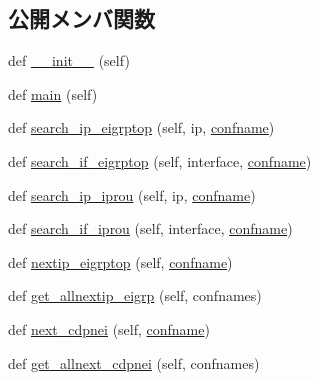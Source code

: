 \subsection*{公開メンバ関数}
\begin{DoxyCompactItemize}
\item 
def \mbox{\hyperlink{classCiscoConf_1_1CiscoRoute_a1f0e3788e7f8459ea9de2f8bd21c1b05}{\+\_\+\+\_\+init\+\_\+\+\_\+}} (self)
\item 
def \mbox{\hyperlink{classCiscoConf_1_1CiscoRoute_ae6779b3141da097bbba9ca2b15b07481}{main}} (self)
\item 
def \mbox{\hyperlink{classCiscoConf_1_1CiscoRoute_a73d916cf6fe50d2483adf1832ae99400}{search\+\_\+ip\+\_\+eigrptop}} (self, ip, \mbox{\hyperlink{classCTextFsm_1_1CTextFsm_afaf1b7c90c7fc6173ecc700966132c5c}{confname}})
\item 
def \mbox{\hyperlink{classCiscoConf_1_1CiscoRoute_ab6b6e674d00d538f497dbca5313297ce}{search\+\_\+if\+\_\+eigrptop}} (self, interface, \mbox{\hyperlink{classCTextFsm_1_1CTextFsm_afaf1b7c90c7fc6173ecc700966132c5c}{confname}})
\item 
def \mbox{\hyperlink{classCiscoConf_1_1CiscoRoute_ae513b71a4e432a9d36315e9b5705c23c}{search\+\_\+ip\+\_\+iprou}} (self, ip, \mbox{\hyperlink{classCTextFsm_1_1CTextFsm_afaf1b7c90c7fc6173ecc700966132c5c}{confname}})
\item 
def \mbox{\hyperlink{classCiscoConf_1_1CiscoRoute_abd83b9c4cb4ddaf2a35f2e750f390eb0}{search\+\_\+if\+\_\+iprou}} (self, interface, \mbox{\hyperlink{classCTextFsm_1_1CTextFsm_afaf1b7c90c7fc6173ecc700966132c5c}{confname}})
\item 
def \mbox{\hyperlink{classCiscoConf_1_1CiscoRoute_aacb6440961bd868ec0f577b9b490324f}{nextip\+\_\+eigrptop}} (self, \mbox{\hyperlink{classCTextFsm_1_1CTextFsm_afaf1b7c90c7fc6173ecc700966132c5c}{confname}})
\item 
def \mbox{\hyperlink{classCiscoConf_1_1CiscoRoute_a645db136acb549afe73227236d184edd}{get\+\_\+allnextip\+\_\+eigrp}} (self, confnames)
\item 
def \mbox{\hyperlink{classCiscoConf_1_1CiscoRoute_a987ecf2aab407917590d6741954ec008}{next\+\_\+cdpnei}} (self, \mbox{\hyperlink{classCTextFsm_1_1CTextFsm_afaf1b7c90c7fc6173ecc700966132c5c}{confname}})
\item 
def \mbox{\hyperlink{classCiscoConf_1_1CiscoRoute_a0821ef00967e8f689201c1eef239cfdc}{get\+\_\+allnext\+\_\+cdpnei}} (self, confnames)
\end{DoxyCompactItemize}
